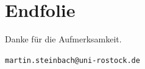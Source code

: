 \documentclass[usenames,dvipsnames]{beamer}
\begin{document}
\part{Endfolie}
\begin{frame}

\framebreak
\begin{center}
\Large \textcolor{red!60}{{Danke für die Aufmerksamkeit.}}\\
\vspace{0.5 cm}
\end{center}
\begin{center}

\texttt{\scriptsize martin.steinbach@uni-rostock.de}\\

\end{center}



\end{frame}
\end{document}
